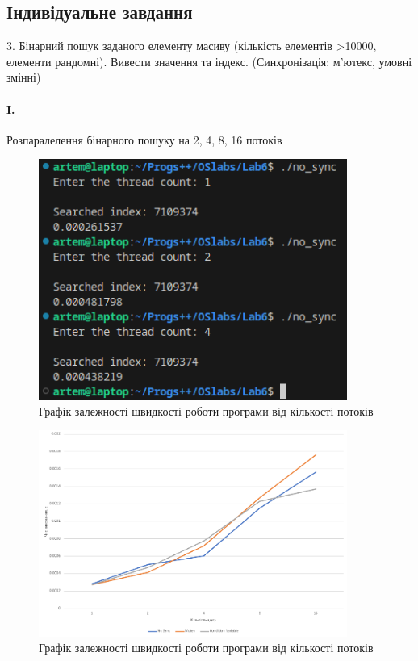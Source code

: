 \documentclass[12pt]{extarticle}
\begin{document}
\subsection*{Індивідуальне завдання}

3. Бінарний пошук заданого елементу масиву (кількість елементів >10000,
елементи рандомні). Вивести значення та індекс. (Синхронізація: м’ютекс,
умовні змінні)

\paragraph{I.} Розпаралелення бінарного пошуку на 2, 4, 8, 16 потоків


\begin{figure}[H]
    \centering
    \includegraphics[width=0.90\textwidth]{console}
    \caption{Графік залежності швидкості роботи програми від кількості потоків}
\end{figure}
\begin{figure}[H]
    \centering
    \includegraphics[width=0.90\textwidth]{graph}
    \caption{Графік залежності швидкості роботи програми від кількості потоків}
\end{figure}
\end{document}
